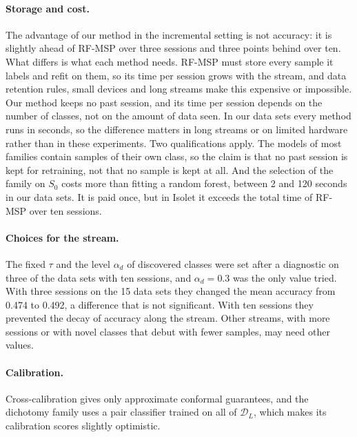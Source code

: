 \documentclass[pdflatex,sn-basic]{sn-jnl}
\newcommand{\DL}{\mathcal{D}_L}
\begin{document}
\paragraph{Storage and cost.} The advantage of our method in the incremental setting is not accuracy: it is slightly ahead of RF-MSP over three sessions and three points behind over ten. What differs is what each method needs. RF-MSP must store every sample it labels and refit on them, so its time per session grows with the stream, and data retention rules, small devices and long streams make this expensive or impossible. Our method keeps no past session, and its time per session depends on the number of classes, not on the amount of data seen. In our data sets every method runs in seconds, so the difference matters in long streams or on limited hardware rather than in these experiments. Two qualifications apply. The models of most families contain samples of their own class, so the claim is that no past session is kept for retraining, not that no sample is kept at all. And the selection of the family on $S_0$ costs more than fitting a random forest, between 2 and 120 seconds in our data sets. It is paid once, but in Isolet it exceeds the total time of RF-MSP over ten sessions.

\paragraph{Choices for the stream.} The fixed $\tau$ and the level $\alpha_d$ of discovered classes were set after a diagnostic on three of the data sets with ten sessions, and $\alpha_d = 0.3$ was the only value tried. With three sessions on the 15 data sets they changed the mean accuracy from 0.474 to 0.492, a difference that is not significant. With ten sessions they prevented the decay of accuracy along the stream. Other streams, with more sessions or with novel classes that debut with fewer samples, may need other values.

\paragraph{Calibration.} Cross-calibration gives only approximate conformal guarantees, and the dichotomy family uses a pair classifier trained on all of $\DL$, which makes its calibration scores slightly optimistic.
\end{document}
